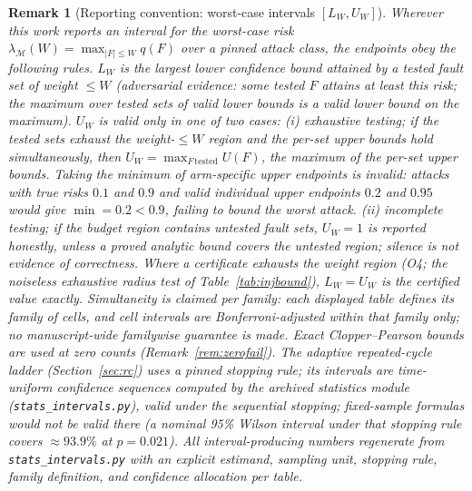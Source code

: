 \documentclass[pdflatex,sn-mathphys-num]{sn-jnl}
\theoremstyle{thmstyleone}
\theoremstyle{thmstyletwo}
\newtheorem{remark}{Remark}
\theoremstyle{thmstylethree}
\begin{document}
\begin{remark}[{Reporting convention: worst-case intervals $[L_W,U_W]$}]\label{rem:intervals}
Wherever this work reports an interval for the worst-case risk $\lambda_{\mathcal{M}}(W)=\max_{|F|\le W}q(F)$ over a pinned attack class, the endpoints obey the following rules. $L_W$ is the largest lower confidence bound attained by a \emph{tested} fault set of weight $\le W$ (adversarial evidence: some tested $F$ attains at least this risk; the maximum over tested sets of valid lower bounds is a valid lower bound on the maximum). $U_W$ is valid only in one of two cases: \emph{(i) exhaustive testing}; if the tested sets exhaust the weight-$\le W$ region and the per-set upper bounds hold simultaneously, then $U_W=\max_{F\,\mathrm{tested}}U(F)$, the \emph{maximum} of the per-set upper bounds. Taking the minimum of arm-specific upper endpoints is invalid: attacks with true risks $0.1$ and $0.9$ and valid individual upper endpoints $0.2$ and $0.95$ would give $\min=0.2<0.9$, failing to bound the worst attack. \emph{(ii) incomplete testing}; if the budget region contains untested fault sets, $U_W=1$ is reported honestly, unless a proved analytic bound covers the untested region; silence is not evidence of correctness. Where a certificate exhausts the weight region (O4; the noiseless exhaustive radius test of Table~\ref{tab:injbound}), $L_W=U_W$ is the certified value exactly. Simultaneity is claimed \emph{per family}: each displayed table defines its family of cells, and cell intervals are Bonferroni-adjusted within that family only; no manuscript-wide familywise guarantee is made. Exact Clopper--Pearson bounds are used at zero counts (Remark~\ref{rem:zerofail}). The adaptive repeated-cycle ladder (Section~\ref{sec:rc}) uses a pinned stopping rule; its intervals are time-uniform confidence sequences \cite{howard2021confidence} computed by the archived statistics module (\texttt{stats\_intervals.py}), valid under the sequential stopping; fixed-sample formulas would not be valid there (a nominal 95\% Wilson interval under that stopping rule covers $\approx\!93.9\%$ at $p=0.021$). All interval-producing numbers regenerate from \texttt{stats\_intervals.py} with an explicit estimand, sampling unit, stopping rule, family definition, and confidence allocation per table.
\end{remark}
\end{document}
